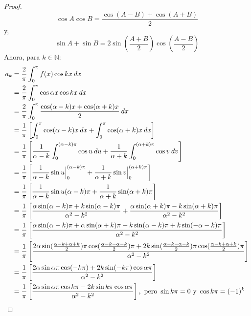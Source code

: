 \documentclass[12pt]{report}
\newcounter{it}
\theoremstyle{largebreak}
\begin{document}
\begin{proof}
\begin{equation*}
            \cos A\cos B=\frac{\cos (A-B)+\cos (A+B)}{2}
        \end{equation*}
        y,
        \begin{equation*}
            \sin A+\sin B=2\sin\left(\frac{A+B}{2}\right)\cos\left(\frac{A-B}{2}\right)
        \end{equation*}
        Ahora, para $k\in\mathbb{N}$:
        \begin{equation*}
            \begin{split}
                a_k&=\frac{2}{\pi}\int_{0}^{\pi}f(x)\cos kx\:dx\\
                &=\frac{2}{\pi}\int_{0}^{\pi}\cos\alpha x\cos kx\:dx\\
                &=\frac{2}{\pi}\int_{0}^{\pi}\frac{\cos(\alpha-k)x+\cos(\alpha+k)x}{2}\:dx\\
                &=\frac{1}{\pi}\left[\int_{0}^{\pi}\cos(\alpha-k)x\:dx+\int_{0}^{\pi}\cos(\alpha+k)x\:dx\right]\\
                &=\frac{1}{\pi}\left[\frac{1}{\alpha-k}\int_{0}^{(\alpha-k)\pi}\cos u\:du+\frac{1}{\alpha+k}\int_{0}^{(\alpha+k)\pi}\cos v\:dv\right]\\
                &=\frac{1}{\pi}\left[\frac{1}{\alpha-k}\sin u\Big|_{0}^{(\alpha-k)\pi}+\frac{1}{\alpha+k}\sin v\Big|_{0}^{(\alpha+k)\pi} \right]\\
                &=\frac{1}{\pi}\left[\frac{1}{\alpha-k}\sin u(\alpha-k)\pi+\frac{1}{\alpha+k}\sin (\alpha+k)\pi \right]\\
                &=\frac{1}{\pi}\left[\frac{\alpha\sin(\alpha-k)\pi+k\sin(\alpha-k)\pi}{\alpha^2-k^2}+\frac{\alpha\sin(\alpha+k)\pi-k\sin(\alpha+k)\pi}{\alpha^2-k^2}\right]\\
                &=\frac{1}{\pi}\left[\frac{\alpha\sin(\alpha-k)\pi+\alpha\sin(\alpha+k)\pi+k\sin(\alpha-k)\pi+k\sin(-\alpha-k)\pi}{\alpha^2-k^2}\right]\\
                &=\frac{1}{\pi}\left[\frac{2\alpha\sin(\frac{\alpha-k+\alpha+k}{2})\pi\cos(\frac{\alpha-k-\alpha-k}{2})\pi+2k\sin(\frac{\alpha-k-\alpha-k}{2})\pi\cos(\frac{\alpha-k+\alpha+k}{2})\pi}{\alpha^2-k^2}\right]\\
                &=\frac{1}{\pi}\left[\frac{2\alpha\sin\alpha\pi\cos(-k\pi)+2k\sin(-k\pi)\cos\alpha\pi}{\alpha^2-k^2}\right]\\
                &=\frac{1}{\pi}\left[\frac{2\alpha\sin\alpha\pi\cos k\pi-2k\sin k\pi\cos \alpha\pi}{\alpha^2-k^2}\right],\textup{ pero }\sin k\pi=0\textup{ y }\cos k\pi=(-1)^k \\

\end{split}
\end{equation*}
\end{proof}
\end{document}
